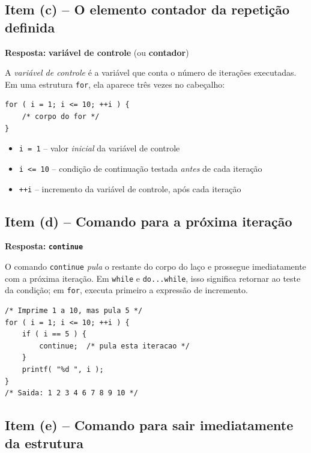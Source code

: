 \documentclass[12pt,a4paper]{article}
\begin{document}
\subsection*{Item (c) -- O elemento contador da repetição definida}

\begin{respostabox}
\textbf{Resposta:} \textcolor{deitelblue}{\textbf{variável de controle}} (ou \textbf{contador})

A \textit{variável de controle} é a variável que conta o número de iterações executadas.
Em uma estrutura \texttt{for}, ela aparece três vezes no cabeçalho:
\begin{lstlisting}
for ( i = 1; i <= 10; ++i ) {
    /* corpo do for */
}
\end{lstlisting}
\begin{itemize}[noitemsep]
  \item \texttt{i = 1} -- valor \textit{inicial} da variável de controle
  \item \texttt{i <= 10} -- condição de continuação testada \textit{antes} de cada iteração
  \item \texttt{++i} -- incremento da variável de controle, após cada iteração
\end{itemize}
\end{respostabox}

\subsection*{Item (d) -- Comando para a próxima iteração}

\begin{respostabox}
\textbf{Resposta:} \textcolor{deitelblue}{\textbf{\texttt{continue}}}

O comando \texttt{continue} \textit{pula} o restante do corpo do laço e prossegue
imediatamente com a próxima iteração. Em \texttt{while} e \texttt{do...while}, isso
significa retornar ao teste da condição; em \texttt{for}, executa primeiro a expressão
de incremento.

\begin{lstlisting}
/* Imprime 1 a 10, mas pula 5 */
for ( i = 1; i <= 10; ++i ) {
    if ( i == 5 ) {
        continue;  /* pula esta iteracao */
    }
    printf( "%d ", i );
}
/* Saida: 1 2 3 4 6 7 8 9 10 */
\end{lstlisting}
\end{respostabox}

\subsection*{Item (e) -- Comando para sair imediatamente da estrutura}
\end{document}
